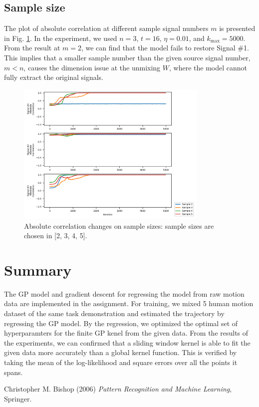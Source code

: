 \documentclass[conference]{IEEEtran}
\begin{document}
\subsection{Sample size}

The plot of absolute correlation at different sample signal numbers $m$ is presented in Fig. \ref{fig:sample_abs_test}.
In the experiment, we used $n=3$, $t=16$, $\eta=0.01$, and $k_{\text{max}} = 5000$.
From the result at $m=2$, we can find that the model fails to restore Signal \#1. This implies that a smaller sample number than the given source signal number, $m<n$, causes the dimension issue at the unmixing $W$, where the model cannot fully extract the original signals.

\begin{figure}[!t]
	\centering
	\includegraphics[width=3.6in]{sample_abs_test.png}	
	\caption{Absolute correlation changes on sample sizes: sample sizes are chosen in [2, 3, 4, 5].}
	\label{fig:sample_abs_test}
\end{figure}


\section{Summary} %

The GP model and gradient descent for regressing the model from raw motion data are implemented in the assignment. 
For training, we mixed 5 human motion dataset of the same task demonstration and estimated the trajectory by regressing the GP model.
By the regression, we optimized the optimal set of hyperparamters for the finite GP kenel from the given data.
From the results of the experiments, we can confirmed that a sliding window kernel is able to fit the given data more accurately than a global kernel function.
This is verified by taking the mean of the log-likelihood and square errors over all the points it spans.




\begin{thebibliography}{9}
Christopher M. Bishop (2006) \emph{Pattern Recognition and Machine Learning}, Springer.
\end{thebibliography}
\end{document}

